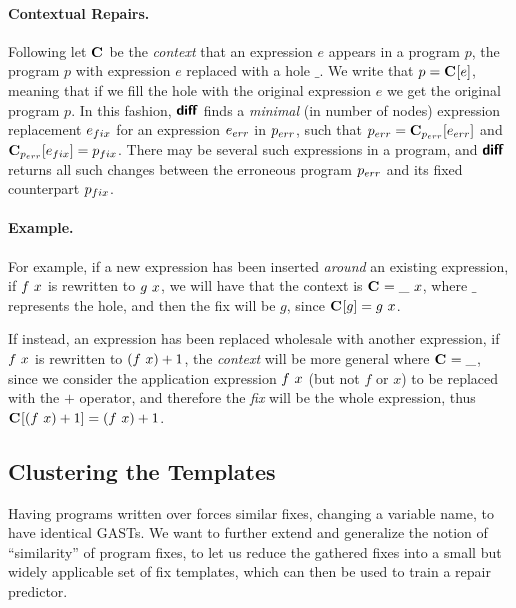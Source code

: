 \paragraph{Contextual Repairs.}
%
Following \cite{Felleisen92} let $\mathbf{C}_{}$ be the \emph{context} that an
expression $e$ appears in a program $p$, \ie the program $p$ with expression $e$
replaced with a hole $\_$.
%
We write that $p = \mathbf{C}_{}[e]$, meaning that if we fill the hole with the
original expression $e$ we get the original program $p$.
%
In this fashion, $\bm{\mathsf{diff}}$ finds a \emph{minimal} (in number of nodes)
expression replacement $e_{fix}$ for an expression $e_{err}$ in $p_{err}$, such that
$p_{err} = \mathbf{C}_{p_{err}}[e_{err}]$ and $\mathbf{C}_{p_{err}}[e_{fix}] = p_{fix}$.
%
There may be several such expressions in a program, and $\bm{\mathsf{diff}}$ returns all
such changes between the erroneous program $p_{err}$ and its fixed counterpart
$p_{fix}$.

\paragraph{Example.}
%
For example, if a new expression has been inserted \emph{around} an existing
expression, \eg if $f\ x$ is rewritten to $g\ x$, we will have
that the context is $\mathbf{C}_{} = \_\ x$, where $\_$ represents the
hole, and then the fix will be $g$, since $\mathbf{C}_{}[g] = g\ x$.

If instead, an expression has been replaced wholesale with another expression,
\eg if $f\ x$ is rewritten to $(f\ x) + 1$, the
\emph{context} will be more general where $\mathbf{C}_{} = \_$, since we consider
the application expression $f\ x$ (but not $f$ or $x$) to be replaced
with the $+$ operator, and therefore the \emph{fix} will be the whole
expression, thus $\mathbf{C}_{}[(f\ x) + 1] =
(f\ x) + 1$.

\subsection{Clustering the Templates}

Having programs written over \repairLang forces similar fixes, \ie changing a
variable name, to have identical GASTs. We want to further extend and generalize
the notion of ``similarity'' of program fixes, to let us reduce the gathered
fixes into a small but widely applicable set of fix templates, which can then be
used to train a repair predictor.


